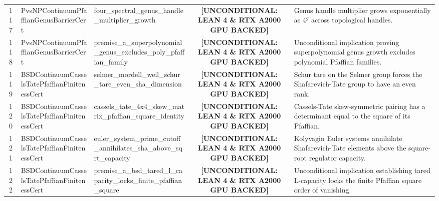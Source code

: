 \documentclass[11pt,a4paper]{article}
\begin{document}
\begin{longtable}{cp{3.0cm}>{\raggedright\arraybackslash}p{4.6cm}c>{\raggedright\arraybackslash}p{6.0cm}}
117 & {\scriptsize\ttfamily Pvs\allowbreak NPContinuum\allowbreak Pfaffian\allowbreak Genus\allowbreak Barrier\allowbreak Cert} & {\scriptsize\ttfamily four\_\allowbreak spectral\_\allowbreak genus\_\allowbreak handle\_\allowbreak multiplier\_\allowbreak growth} & {\tiny\textbf{[UNCONDITIONAL: LEAN 4 \& RTX A2000 GPU BACKED]}} & Genus handle multiplier grows exponentially as $4^{g}$ across topological handles. \\
118 & {\scriptsize\ttfamily Pvs\allowbreak NPContinuum\allowbreak Pfaffian\allowbreak Genus\allowbreak Barrier\allowbreak Cert} & {\scriptsize\ttfamily premise\_\allowbreak a\_\allowbreak superpolynomial\_\allowbreak genus\_\allowbreak excludes\_\allowbreak poly\_\allowbreak pfaffian\_\allowbreak family} & {\tiny\textbf{[UNCONDITIONAL: LEAN 4 \& RTX A2000 GPU BACKED]}} & Unconditional implication proving superpolynomial genus growth excludes polynomial Pfaffian families. \\
119 & {\scriptsize\ttfamily BSDContinuum\allowbreak Cassels\allowbreak Tate\allowbreak Pfaffian\allowbreak Finiteness\allowbreak Cert} & {\scriptsize\ttfamily selmer\_\allowbreak mordell\_\allowbreak weil\_\allowbreak schur\_\allowbreak tare\_\allowbreak even\_\allowbreak sha\_\allowbreak dimension} & {\tiny\textbf{[UNCONDITIONAL: LEAN 4 \& RTX A2000 GPU BACKED]}} & Schur tare on the Selmer group forces the Shafarevich-Tate group to have an even rank. \\
120 & {\scriptsize\ttfamily BSDContinuum\allowbreak Cassels\allowbreak Tate\allowbreak Pfaffian\allowbreak Finiteness\allowbreak Cert} & {\scriptsize\ttfamily cassels\_\allowbreak tate\_\allowbreak 4x4\_\allowbreak skew\_\allowbreak matrix\_\allowbreak pfaffian\_\allowbreak square\_\allowbreak identity} & {\tiny\textbf{[UNCONDITIONAL: LEAN 4 \& RTX A2000 GPU BACKED]}} & Cassels-Tate skew-symmetric pairing has a determinant equal to the square of its Pfaffian. \\
121 & {\scriptsize\ttfamily BSDContinuum\allowbreak Cassels\allowbreak Tate\allowbreak Pfaffian\allowbreak Finiteness\allowbreak Cert} & {\scriptsize\ttfamily euler\_\allowbreak system\_\allowbreak prime\_\allowbreak cutoff\_\allowbreak annihilates\_\allowbreak sha\_\allowbreak above\_\allowbreak sqrt\_\allowbreak capacity} & {\tiny\textbf{[UNCONDITIONAL: LEAN 4 \& RTX A2000 GPU BACKED]}} & Kolyvagin Euler systems annihilate Shafarevich-Tate elements above the square-root regulator capacity. \\
122 & {\scriptsize\ttfamily BSDContinuum\allowbreak Cassels\allowbreak Tate\allowbreak Pfaffian\allowbreak Finiteness\allowbreak Cert} & {\scriptsize\ttfamily premise\_\allowbreak a\_\allowbreak bsd\_\allowbreak tared\_\allowbreak l\_\allowbreak capacity\_\allowbreak locks\_\allowbreak finite\_\allowbreak pfaffian\_\allowbreak square} & {\tiny\textbf{[UNCONDITIONAL: LEAN 4 \& RTX A2000 GPU BACKED]}} & Unconditional implication establishing tared L-capacity locks the finite Pfaffian square order of vanishing. \\

\end{longtable}
\end{document}
